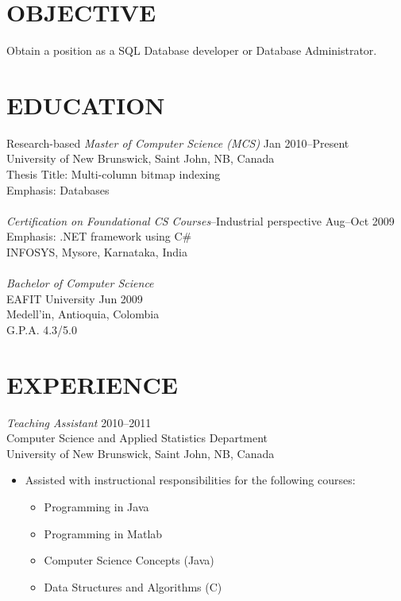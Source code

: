\documentclass[line,margin]{res}
\begin{document}
\address{19603 Fernhaven, Katy, TX 77449}
\address{(281)-398-9692\\eduardo.gutarra@unb.ca}

 
\begin{resume}

\section{ OBJECTIVE} %
\label{sec:objective}
    Obtain a position as a SQL Database developer or Database Administrator.

\section{ EDUCATION} %
\label{sec:education}
    Research-based {\sl Master of Computer Science (MCS)} \hfill Jan 2010--Present\\
    University of New Brunswick, Saint John, NB, Canada\\
    Thesis Title: Multi-column bitmap indexing\\
    Emphasis: Databases\\\\
    {\sl Certification on Foundational CS Courses}--Industrial perspective \hfill Aug--Oct 2009\\
    Emphasis: .NET framework using C\#\\
    INFOSYS, Mysore, Karnataka, India\\\\
    {\sl Bachelor of Computer Science}\\
    EAFIT University \hfill Jun 2009\\
    Medell\a'in, Antioquia, Colombia\\
    G.P.A. 4.3/5.0\\

\section{ EXPERIENCE} %
\label{sec:experience}

{\sl Teaching Assistant} \hfill 2010--2011\\
Computer Science and Applied Statistics Department\\
University of New Brunswick, Saint John, NB, Canada
\begin{itemize} %
    \item Assisted with instructional responsibilities for the following courses:
    \begin{itemize} \itemsep -2pt
        \item Programming in Java
        \item Programming in Matlab
        \item Computer Science Concepts (Java)
        \item Data Structures and Algorithms (C)
    \end{itemize}
\end{itemize}


\end{resume}
\end{document}
